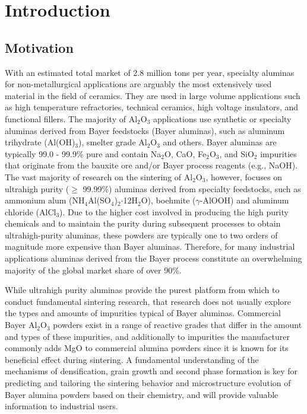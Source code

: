 \chapter{Introduction} \label{chapter1:introduction}

\section{Motivation}
With an estimated total market of 2.8 million tons per year, specialty aluminas for non-metallurgical applications are arguably the most extensively used material in the field of ceramics. They are used in large volume applications such as high temperature refractories, technical ceramics, high voltage insulators, and functional fillers. The majority of Al$_{2}$O$_{3}$ applications use synthetic or specialty aluminas derived from Bayer feedstocks (Bayer aluminas), such as aluminum trihydrate (Al(OH)$_{3}$), smelter grade Al$_{2}$O$_{3}$ and others. Bayer aluminas are typically 99.0 - 99.9\% pure and contain Na$_{2}$O, CaO, Fe$_{2}$O$_{3}$, and SiO$_{2}$ impurities that originate from the bauxite ore and/or Bayer process reagents (e.g., NaOH). The vast majority of research on the sintering of Al$_{2}$O$_{3}$, however, focuses on ultrahigh purity ($\geq$ 99.99\%) aluminas derived from specialty feedstocks, such as ammonium alum (NH$_{4}$Al(SO$_{4}$)$_{2}$$\cdot$12H$_{2}$O), boehmite ($\gamma$-AlOOH) and aluminum chloride (AlCl$_{3}$). Due to the higher cost involved in producing the high purity chemicals and to maintain the purity during subsequent processes to obtain ultrahigh-purity aluminas, these powders are typically one to two orders of magnitude more expensive than Bayer aluminas. Therefore, for many industrial applications aluminas derived from the Bayer process constitute an overwhelming majority of the global market share of over 90\%.

While ultrahigh purity aluminas provide the purest platform from which to conduct fundamental sintering research, that research does not usually explore the types and amounts of impurities typical of Bayer aluminas. Commercial Bayer Al$_{2}$O$_{3}$ powders exist in a range of reactive grades that differ in the amount and types of these impurities, and additionally to impurities the manufacturer commonly adds MgO to commercial alumina powders since it is known for its beneficial effect during sintering. A fundamental understanding of the mechanisms of densification, grain growth and second phase formation is key for predicting and tailoring the sintering behavior and microstructure evolution of Bayer alumina powders based on their chemistry, and will provide valuable information to industrial users.


